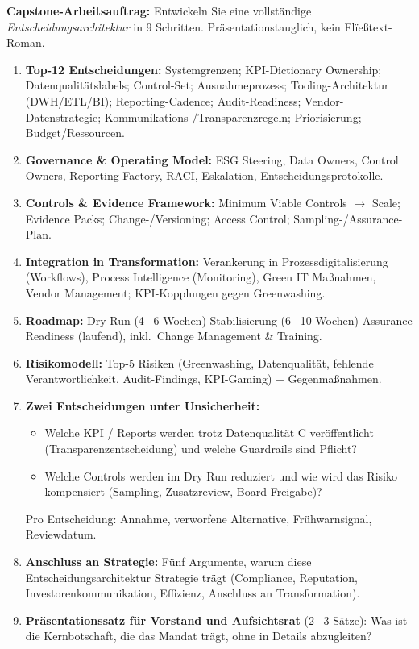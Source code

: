 \documentclass[11pt,a4paper,oneside]{article}
\begin{document}
\noindent\textbf{Capstone-Arbeitsauftrag:} Entwickeln Sie eine vollst\"andige \emph{Entscheidungsarchitektur} in 9 Schritten. Pr\"asentationstauglich, kein Fl\"ie{\ss}text-Roman.

\begin{enumerate}
  \item \textbf{Top-12 Entscheidungen:} Systemgrenzen; KPI-Dictionary Ownership; Datenqualit\"atslabels; Control-Set; Ausnahmeprozess; Tooling-Architektur (DWH/ETL/BI); Reporting-Cadence; Audit-Readiness; Vendor-Datenstrategie; Kommunikations-/Transparenzregeln; Priorisierung; Budget/Ressourcen.
  \item \textbf{Governance \& Operating Model:} ESG Steering, Data Owners, Control Owners, Reporting Factory, RACI, Eskalation, Entscheidungsprotokolle.
  \item \textbf{Controls \& Evidence Framework:} Minimum Viable Controls $\rightarrow$ Scale; Evidence Packs; Change-/Versioning; Access Control; Sampling-/Assurance-Plan.
  \item \textbf{Integration in Transformation:} Verankerung in Prozessdigitalisierung (Workflows), Process Intelligence (Monitoring), Green IT Ma{\ss}nahmen, Vendor Management; KPI-Kopplungen gegen Greenwashing.
  \item \textbf{Roadmap:} Dry Run (4\,--\,6 Wochen) \textrightarrow{} Stabilisierung (6\,--\,10 Wochen) \textrightarrow{} Assurance Readiness (laufend), inkl.\ Change Management \& Training.
  \item \textbf{Risikomodell:} Top-5 Risiken (Greenwashing, Datenqualit\"at, fehlende Verantwortlichkeit, Audit-Findings, KPI-Gaming) + Gegenma{\ss}nahmen.
  \item \textbf{Zwei Entscheidungen unter Unsicherheit:}
    \begin{itemize}
      \item Welche KPI / Reports werden trotz Datenqualit\"at C ver\"offentlicht (Transparenzentscheidung) \textendash{} und welche Guardrails sind Pflicht?
      \item Welche Controls werden im Dry Run reduziert \textendash{} und wie wird das Risiko kompensiert (Sampling, Zusatzreview, Board-Freigabe)?
    \end{itemize}
    Pro Entscheidung: Annahme, verworfene Alternative, Fr\"uhwarnsignal, Reviewdatum.
  \item \textbf{Anschluss an Strategie:} F\"unf Argumente, warum diese Entscheidungsarchitektur Strategie tr\"agt (Compliance, Reputation, Investorenkommunikation, Effizienz, Anschluss an Transformation).
  \item \textbf{Pr\"asentationssatz f\"ur Vorstand und Aufsichtsrat} (2\,--\,3 S\"atze): Was ist die Kernbotschaft, die das Mandat tr\"agt, ohne in Details abzugleiten?
\end{enumerate}
\end{document}

